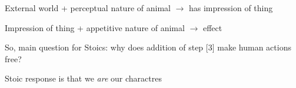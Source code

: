 \documentclass[11pt]{article}
\begin{document}
External world + perceptual nature of animal $\rightarrow$ has impression of thing
\vspace*{1mm}

Impression of thing + appetitive nature of animal $\rightarrow$ effect 
\vspace*{1mm}

\noindent So, main question for Stoics: why does addition of step [3] make human actions free?
\vspace*{2mm}

\noindent Stoic response is that we \emph{are} our charactres
\end{document}
